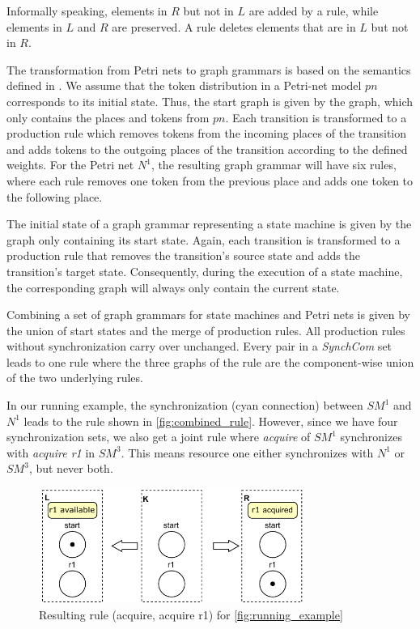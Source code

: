 \documentclass[conference]{IEEEtran}
\begin{document}
Informally speaking, elements in $R$ but not in $L$ are added by a rule, while elements in $L$ and $R$ are preserved.
A rule deletes elements that are in $L$ but not in $R$.

The transformation from Petri nets to graph grammars is based on the semantics defined in \cite{ehrigGraphGrammarsPetri2004}.
We assume that the token distribution in a Petri-net model $pn$ corresponds to its initial state.
Thus, the start graph is given by the graph, which only contains the places and tokens from $pn$.
Each transition is transformed to a production rule which removes tokens from the incoming places of the transition and adds tokens to the outgoing places of the transition according to the defined weights.
For the Petri net $N^1$, the resulting graph grammar will have six rules, where each rule removes one token from the previous place and adds one token to the following place.

The initial state of a graph grammar representing a state machine is given by the graph only containing its start state.
Again, each transition is transformed to a production rule that removes the transition's source state and adds the transition's target state.
Consequently, during the execution of a state machine, the corresponding graph will always only contain the current state.

Combining a set of graph grammars for state machines and Petri nets is given by the union of start states and the merge of production rules.
All production rules without synchronization carry over unchanged.
Every pair in a \textit{SynchCom} set leads to one rule where the three graphs of the rule are the component-wise union of the two underlying rules.

In our running example, the synchronization (cyan connection) between $SM^1$ and $N^1$ leads to the rule shown in \autoref{fig:combined_rule}.
However, since we have four synchronization sets, we also get a joint rule where \textit{acquire} of $SM^1$ synchronizes with \textit{acquire r1} in $SM^3$.
This means resource one either synchronizes with $N^1$ or $SM^3$, but never both.

\begin{figure}[h]
    \centering
    \includegraphics[width=3.4in]{combined_rule}
    \caption{Resulting rule (acquire, acquire r1) for \autoref{fig:running_example}}
    \label{fig:combined_rule}
\end{figure}
\end{document}

